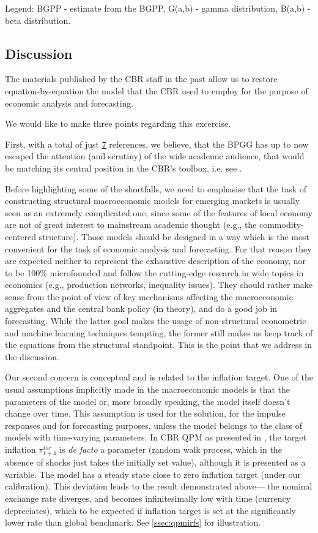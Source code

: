 \documentclass[12pt]{article}
\begin{document}
Legend: BGPP - estimate from the BGPP, G(a,b) - gamma distribution, B(a,b) - beta distribution.

\subsection{Discussion}

The materials published by the CBR staff in the past allow us to restore equation-by-equation the model that the CBR used to employ for the purpose of economic analysis and forecasting. 

We would like to make three points regarding this excercise. 

First, with a total of just \href{https://scholar.google.com/scholar?cites=15691293148877343587&as_sdt=2005&sciodt=0,5&hl=en}{7} references, we believe, that the BPGG has up to now escaped the attention (and scrutiny) of the wide academic audience, that would be matching its central position in the CBR's toolbox, i.e. see \cite{bankofrussiampr201501}. 

Before highlighting some of the shortfalls, we need to emphasise that the task of constructing structural macroeconomic models for emerging markets is usually seen as an extremely complicated one, since some of the features of local economy are not of great interest to mainstream academic thought (e.g., the commodity-centered structure). Those models should be designed in a way which is the most convenient for the task of economic analysis and forecasting. For that reason they are  expected neither to represent the exhaustive description of the economy, nor to be 100\% microfounded and  follow the cutting-edge research in wide topics in economics (e.g., production networks, inequality issues). They should rather make sense from the point of view of key mechanisms affecting the macroeconomic aggregates and the central bank policy (in theory), and do a good job in forecasting. While the latter goal makes the usage of non-structural econometric and machine learning techniques tempting, the former still makes us keep track of the equations from the structural standpoint. This is the point that we address in the discussion. 

Our second concern is conceptual and is related to the inflation target. One of the usual assumptions implicitly made in the macroeconomic models is that the parameters of the model or, more broadly speaking, the model itself doesn't change over time. This assumption is used for the solution, for the impulse responses and for forecasting purposes, unless the model belongs to the class of models with time-varying parameters. In CBR QPM as presented in \cite{bgpp2008}, the target inflation $\pi_{t+4}^{tar}$ is {\it de facto} a parameter (random walk process, which in the absence of shocks just takes the initially set value), although it is presented as a variable. The model has a steady state close to zero inflation target (under our calibration). This deviation leads to the result demonstrated above--- the nominal exchange rate diverges, and becomes infinitesimally low with time (currency depreciates), which to be expected if inflation target is set at the significantly lower rate than global benchmark. See \autoref{ssec:qpmirfs} for illustration.
\end{document}
